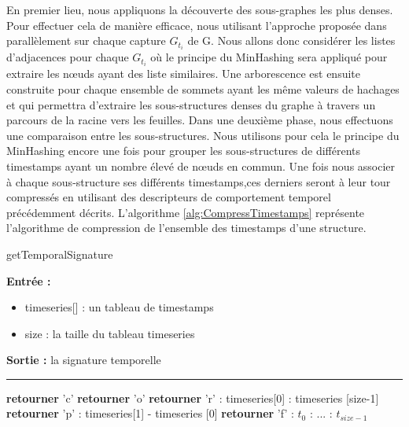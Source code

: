 			 En premier lieu, nous appliquons la découverte des sous-graphes les plus denses. Pour effectuer cela de manière efficace, nous utilisant l'approche proposée dans \citep{hernandez2014compressed} parallèlement sur chaque capture $G_{t_{i}}$ de G. Nous allons donc considérer les listes d'adjacences pour chaque $G_{t_{i}}$ où le principe du MinHashing sera appliqué pour extraire les nœuds ayant des liste similaires. Une arborescence est ensuite construite pour chaque ensemble de sommets ayant les même valeurs de hachages et qui permettra d'extraire les sous-structures denses du graphe à travers un parcours de la racine vers les feuilles. Dans une deuxième phase, nous effectuons une comparaison entre les sous-structures. Nous utilisons pour cela le principe du MinHashing encore une fois pour grouper les sous-structures de différents timestamps ayant un nombre élevé de nœuds en commun. Une fois nous associer à chaque sous-structure ses différents timestamps,ces derniers seront à leur tour compressés en utilisant des descripteurs de comportement temporel précédemment décrits. L'algorithme \ref{alg:CompressTimestamps} représente l'algorithme de compression de l'ensemble des timestamps d'une structure.
			 
			 	\begin{algorithm}
					\label{alg:CompressTimestamps}
					\caption{getTemporalSignature}
					
					\textbf{Entrée :}
						\begin{itemize}[label=$\bullet$]
							\item timeseries[] : un tableau de timestamps
							\item size : la taille du tableau timeseries
						\end{itemize}
					\textbf{Sortie :} la signature temporelle\\							\noindent\rule{\textwidth}{1pt}					
					
				\begin{algorithmic} [1]
						\STATE \textbf{retourner} 'c'   
					\ELSE
							\STATE \textbf{retourner}  'o' 
						\ELSE
								\STATE \textbf{retourner}  'r' : timeseries[0] : timeseries [size-1] 
							\ELSE
									\STATE \textbf{retourner}  'p' : timeseries[1] - timeseries [0] 
								 \ELSE 
								 	\STATE \textbf{retourner}  'f' : $t_0$ : ... : $t_{size-1}$ 
								\ENDIF
							\ENDIF
						\ENDIF
					\ENDIF
				\end{algorithmic}
			\end{algorithm}
			 
